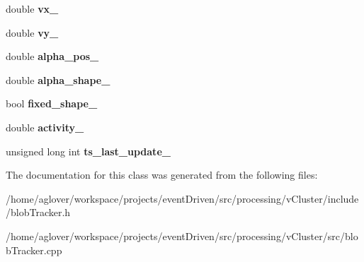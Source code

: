 \begin{DoxyCompactItemize}
\item 
\hypertarget{classBlobTracker_a98a091e1f3a0e16a71ff6602079c9c23}{double {\bfseries vx\-\_\-}}\label{classBlobTracker_a98a091e1f3a0e16a71ff6602079c9c23}

\item 
\hypertarget{classBlobTracker_a5b41c1c66d14c8b794b314ba204a93bd}{double {\bfseries vy\-\_\-}}\label{classBlobTracker_a5b41c1c66d14c8b794b314ba204a93bd}

\item 
\hypertarget{classBlobTracker_ae10a65c546bfa9ed53d341a46080f53f}{double {\bfseries alpha\-\_\-pos\-\_\-}}\label{classBlobTracker_ae10a65c546bfa9ed53d341a46080f53f}

\item 
\hypertarget{classBlobTracker_a5183d2c99bd9dbc6f7170050e5830dea}{double {\bfseries alpha\-\_\-shape\-\_\-}}\label{classBlobTracker_a5183d2c99bd9dbc6f7170050e5830dea}

\item 
\hypertarget{classBlobTracker_a57841b67cf49324e2ff7b9698897e908}{bool {\bfseries fixed\-\_\-shape\-\_\-}}\label{classBlobTracker_a57841b67cf49324e2ff7b9698897e908}

\item 
\hypertarget{classBlobTracker_aaf83587414449f41fa7719f9939c48a8}{double {\bfseries activity\-\_\-}}\label{classBlobTracker_aaf83587414449f41fa7719f9939c48a8}

\item 
\hypertarget{classBlobTracker_a4084fae015313204286ce98259856467}{unsigned long int {\bfseries ts\-\_\-last\-\_\-update\-\_\-}}\label{classBlobTracker_a4084fae015313204286ce98259856467}

\end{DoxyCompactItemize}


The documentation for this class was generated from the following files\-:\begin{DoxyCompactItemize}
\item 
/home/aglover/workspace/projects/event\-Driven/src/processing/v\-Cluster/include/blob\-Tracker.\-h\item 
/home/aglover/workspace/projects/event\-Driven/src/processing/v\-Cluster/src/blob\-Tracker.\-cpp\end{DoxyCompactItemize}
